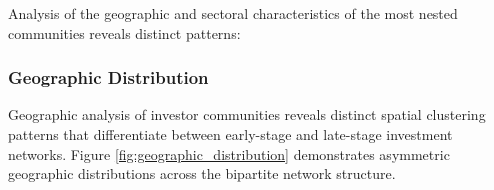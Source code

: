 \documentclass[12pt]{article}
\begin{document}
Analysis of the geographic and sectoral characteristics of the most nested communities reveals distinct patterns:


\subsubsection{Geographic Distribution}

Geographic analysis of investor communities reveals distinct spatial clustering patterns that differentiate between early-stage and late-stage investment networks. Figure \ref{fig:geographic_distribution} demonstrates asymmetric geographic distributions across the bipartite network structure.

\end{document}

